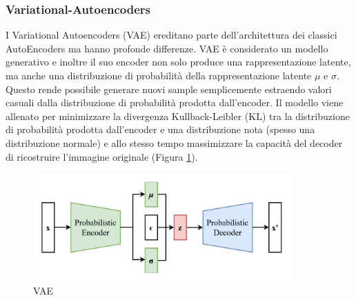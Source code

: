 \subsubsection{Variational-Autoencoders}
I Variational Autoencoders (VAE) \cite{kingma2013auto} ereditano parte dell'architettura dei classici AutoEncoders ma hanno profonde differenze. VAE è considerato un modello generativo e inoltre il suo encoder non solo produce una rappresentazione latente, ma anche una distribuzione di probabilità della rappresentazione latente $\mu$ e $\sigma$. Questo rende possibile generare nuovi sample semplicemente estraendo valori casuali dalla distribuzione di probabilità prodotta dall'encoder.
Il modello viene allenato per minimizzare la divergenza Kullback-Leibler (KL) tra la distribuzione di probabilità prodotta dall'encoder e una distribuzione nota (spesso una distribuzione normale) e allo stesso tempo massimizzare la capacità del decoder di ricostruire l'immagine originale (Figura \ref{vae}).
\begin{figure}[t]
	\centering
	\includegraphics[width=10cm, scale=1]{images/vae}
	\caption{VAE}
	\label{vae}
\end{figure}

